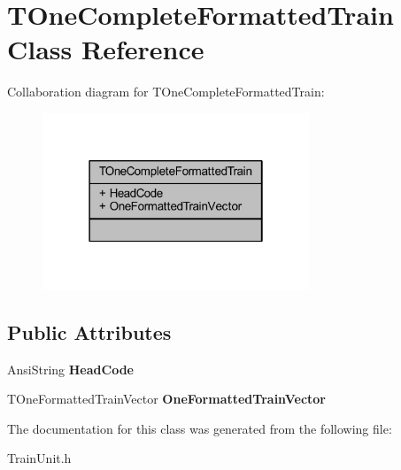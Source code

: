 \hypertarget{class_t_one_complete_formatted_train}{}\section{T\+One\+Complete\+Formatted\+Train Class Reference}
\label{class_t_one_complete_formatted_train}


Collaboration diagram for T\+One\+Complete\+Formatted\+Train\+:\nopagebreak
\begin{figure}[H]
\begin{center}
\leavevmode
\includegraphics[width=226pt]{class_t_one_complete_formatted_train__coll__graph}
\end{center}
\end{figure}
\subsection*{Public Attributes}
\begin{DoxyCompactItemize}
\item 
\mbox{\label{class_t_one_complete_formatted_train_a64e2c06ac8ceb57b8f2cf4fe316fdd09}} 
Ansi\+String {\bfseries Head\+Code}
\item 
\mbox{\label{class_t_one_complete_formatted_train_a7153d13265831ee7c241779b5c803278}} 
T\+One\+Formatted\+Train\+Vector {\bfseries One\+Formatted\+Train\+Vector}
\end{DoxyCompactItemize}


The documentation for this class was generated from the following file\+:\begin{DoxyCompactItemize}
\item 
Train\+Unit.\+h\end{DoxyCompactItemize}
